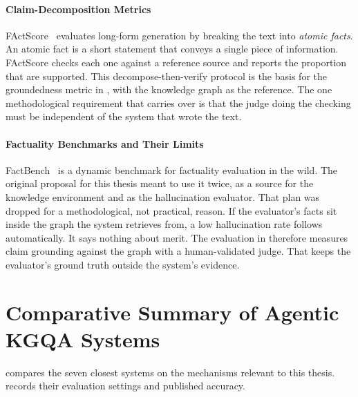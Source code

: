 \paragraph{Claim-Decomposition Metrics}

FActScore~\cite{min2023factscore} evaluates long-form generation by
breaking the text into \emph{atomic facts}. An atomic
fact is a short statement that conveys a single piece of information. FActScore
checks each one against a reference source and reports the proportion that are
supported. This decompose-then-verify protocol is the basis for the groundedness
metric in , with the knowledge graph as the
reference. The one methodological requirement that carries over is that the
judge doing the checking must be independent of the system that wrote the text.

\paragraph{Factuality Benchmarks and Their Limits}

FactBench~\cite{bayat2025factbench} is a dynamic benchmark for factuality
evaluation in the wild. The original proposal for this thesis meant to use it
twice, as a source for the knowledge environment and as the hallucination
evaluator. That plan was dropped for a methodological, not practical, reason. If
the evaluator's facts sit inside the graph the system retrieves from, a low
hallucination rate follows automatically. It says nothing about merit. The
evaluation in  therefore measures claim grounding against the
graph with a human-validated judge. That keeps the evaluator's ground truth
outside the system's evidence.

\section{Comparative Summary of Agentic KGQA
Systems}\label{sec:comparison-table}

 compares the seven closest systems on the mechanisms
relevant to this thesis.  records their evaluation settings
and published accuracy.

